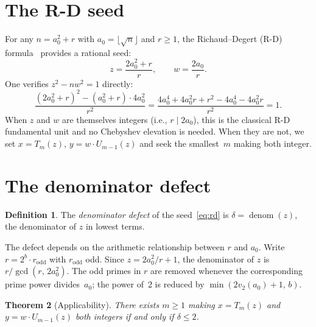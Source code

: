 \documentclass[11pt]{article}
\newtheorem{theorem}{Theorem}
\theoremstyle{definition}
\newtheorem{definition}[theorem]{Definition}
\theoremstyle{remark}
\begin{document}
\section{The R-D seed}\label{sec:seed}

For any $n = a_0^2 + r$ with $a_0 = \lfloor\sqrt{n}\rfloor$ and $r \ge 1$,
the Richaud--Degert (R-D) formula~\cite{richaud1866,degert1958} provides a
rational seed:
\begin{equation}\label{eq:rd}
z = \frac{2a_0^2 + r}{r}, \qquad w = \frac{2a_0}{r}.
\end{equation}
One verifies $z^2 - nw^2 = 1$ directly:
\[
\frac{(2a_0^2+r)^2 - (a_0^2+r) \cdot 4a_0^2}{r^2}
= \frac{4a_0^4 + 4a_0^2 r + r^2 - 4a_0^4 - 4a_0^2 r}{r^2} = 1.
\]
When $z$ and $w$ are themselves integers (i.e., $r \mid 2a_0$), this is
the classical R-D fundamental unit and no Chebyshev elevation is needed.
When they are not, we set $x = T_m(z)$, $y = w \cdot U_{m-1}(z)$ and
seek the smallest~$m$ making both integer.

\section{The denominator defect}

\begin{definition}
The \emph{denominator defect} of the seed~\eqref{eq:rd} is
$\delta = \operatorname{denom}(z)$, the denominator of $z$ in lowest terms.
\end{definition}

The defect depends on the arithmetic relationship between $r$ and $a_0$.
Write $r = 2^b \cdot r_{\mathrm{odd}}$ with $r_{\mathrm{odd}}$ odd.
Since $z = 2a_0^2/r + 1$, the denominator of $z$ is
$r / \gcd(r,\, 2a_0^2)$.  The odd primes in $r$ are removed whenever the
corresponding prime power divides~$a_0$; the power of~$2$ is reduced by
$\min(2v_2(a_0)+1,\, b)$.

\begin{theorem}[Applicability]\label{thm:cond}
There exists $m \ge 1$ making $x = T_m(z)$ and $y = w \cdot U_{m-1}(z)$
both integers if and only if $\delta \le 2$.
\end{theorem}
\end{document}
